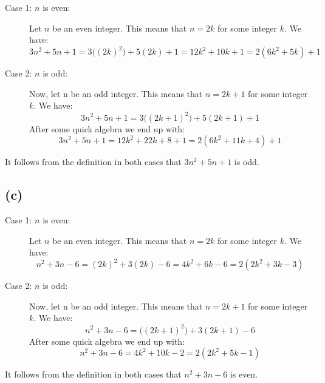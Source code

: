 \documentclass{article}
\begin{document}
\begin{description}
    \item[Case 1: $n$ is even:]
	    Let $n$ be an even integer. This means that $n = 2k$ for some
	    integer $k$. We have:
	    \begin{equation*}
		    3n^2 + 5n + 1 = 3\Big((2k)^2\Big) + 5(2k) + 1 = 12k^2 + 10k
		    + 1 = 2(6k^2 + 5k) + 1
	    \end{equation*}
    \item[Case 2: $n$ is odd:] Now, let n be an odd integer. This means that $n
	    = 2k + 1$ for some integer $k$. We have:
	    \begin{equation*}
		    3n^2 +5n + 1 = 3\Big((2k + 1)^2\Big) + 5(2k+1) + 1 
	    \end{equation*}
	    After some quick algebra we end up with:
	    \begin{equation*}
		   3n^2 + 5n + 1 = 12k^2 + 22k + 8 + 1 = 2(6k^2 + 11k + 4) + 1
	    \end{equation*}


\end{description}

It follows from the definition in both cases that $3n^2 +5n + 1$ is odd.


\subsection*{(c)}


\begin{description}
    \item[Case 1: $n$ is even:]
	    Let $n$ be an even integer. This means that $n = 2k$ for some
	    integer $k$. We have:
	    \begin{equation*}
		n^2 +3n - 6 = (2k)^2 + 3(2k) - 6 = 4k^2 + 6k - 6 = 2(2k^2 + 3k -
		3)
	    \end{equation*}
    \item[Case 2: $n$ is odd:] Now, let n be an odd integer. This means that $n
	    = 2k + 1$ for some integer $k$. We have:
	    \begin{equation*}
		    n^2 + 3n -6 = \Big((2k+1)^2\Big) + 3(2k+1) - 6 
	    \end{equation*}
	    After some quick algebra we end up with:
	    \begin{equation*}
		    n^2 +3n - 6 = 4k^2 + 10k - 2 = 2(2k^2 + 5k -1)
	    \end{equation*}
\end{description}

It follows from the definition in both cases that $n^2 +3n - 6$ is even.
\end{document}
